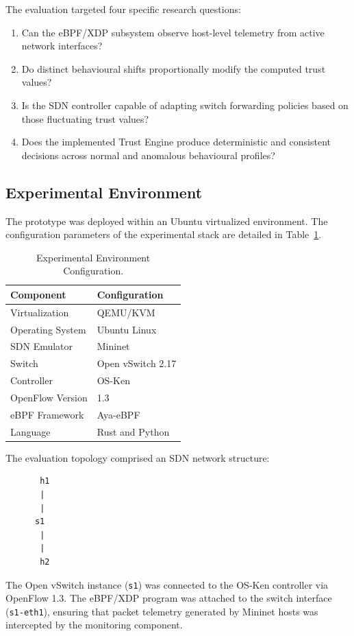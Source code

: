 \documentclass[conference]{IEEEtran}
\begin{document}
The evaluation targeted four specific research questions:
\begin{enumerate}
\item Can the eBPF/XDP subsystem observe host-level telemetry from active network interfaces?
\item Do distinct behavioural shifts proportionally modify the computed trust values?
\item Is the SDN controller capable of adapting switch forwarding policies based on those fluctuating trust values?
\item Does the implemented Trust Engine produce deterministic and consistent decisions across normal and anomalous behavioural profiles?
\end{enumerate}

\subsection{Experimental Environment}
The prototype was deployed within an Ubuntu virtualized environment. The configuration parameters of the experimental stack are detailed in Table~\ref{tab:env}.

\begin{table}[h]
\centering
\caption{Experimental Environment Configuration.}
\label{tab:env}
\begin{tabular}{ll}
\toprule
Component & Configuration \\
\midrule
Virtualization & QEMU/KVM \\
Operating System & Ubuntu Linux \\
SDN Emulator & Mininet \\
Switch & Open vSwitch 2.17 \\
Controller & OS-Ken \\
OpenFlow Version & 1.3 \\
eBPF Framework & Aya-eBPF \\
Language & Rust and Python \\
\bottomrule
\end{tabular}
\end{table}

The evaluation topology comprised an SDN network structure:
\begin{verbatim}
       h1
       |
       |
      s1
       |
       |
       h2
\end{verbatim}

The Open vSwitch instance (\texttt{s1}) was connected to the OS-Ken controller via OpenFlow 1.3. The eBPF/XDP program was attached to the switch interface (\texttt{s1-eth1}), ensuring that packet telemetry generated by Mininet hosts was intercepted by the monitoring component.
\end{document}
